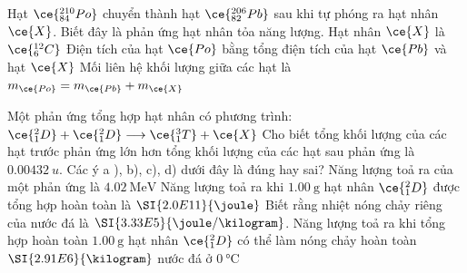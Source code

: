 \begin{ex}
	Hạt $\ce{^{210}_{84}Po}$ chuyển thành hạt $\ce{^{206}_{82}Pb}$ sau khi tự phóng ra hạt nhân $\ce{X}$. Biết đây là phản ứng hạt nhân tỏa năng lượng.
	{Hạt nhân $\ce{X}$ là $\ce{^{12}_6C}$}
	{\True Điện tích của hạt $\ce{Po}$ bằng tổng điện tích của hạt $\ce{Pb}$ và hạt $\ce{X}$}
	{Mối liên hệ khối lượng giữa các hạt là $m_{\ce{Po}}=m_{\ce{Pb}}+m_{\ce{X}}$}
\end{ex}
\begin{ex}
	Một phản ứng tổng hợp hạt nhân có phương trình: $\ce{_1^2D}+ \ce{_1^2D} \longrightarrow\ce{_1^3T}+\ce{X}$ Cho biết tổng khối lượng của các hạt trước phản ứng lớn hơn tổng khối lượng của các hạt sau phản ứng là $\SI{0.00432}{u}$. Các ý a ), b), c), d) dưới đây là đúng hay sai?
	{\True Năng lượng toả ra của một phản ứng là $\SI{4.02}{\mega\electronvolt}$}
	{Năng lượng toả ra khi $\SI{1.00}{\gram}$ hạt nhân $\ce{_1^2D}$ được tổng hợp hoàn toàn là $\SI{2.0E11}{\joule}$}
	{Biết rằng nhiệt nóng chảy riêng của nước đá là $\SI{3.33E5}{\joule/\kilogram}$. Năng lượng toả ra khi tổng hợp hoàn toàn $\SI{1.00}{\gram}$ hạt nhân $\ce{_1^2D}$ có thể làm nóng chảy hoàn toàn $\SI{2.91E6}{\kilogram}$ nước đá ở $\SI{0}{\celsius}$}
\end{ex}
